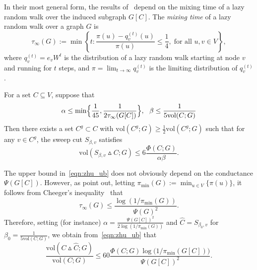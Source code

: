 \documentclass[11pt,twoside]{article}
\newcommand{\set}[1]{\left\{#1\right\}}
\newcommand{\1}{\mathbf{1}}
\newcommand{\wh}[1]{\widehat{#1}}
\newcommand{\vol}{\mathrm{vol}}
\begin{document}
In their most general form, the results of~\citet{zhu2013} depend on the mixing time of a lazy random walk over the induced subgraph $G[C]$. The \emph{mixing time} of a lazy random walk over a graph $G$ is
\begin{equation}
\label{eqn:mixing_time}
\tau_{\infty}(G) := \min\set{ t: \frac{{\pi}(u) - {q}_{v}^{(t)}(u)}
	{{\pi}(u)} \leq \frac{1}{4}, \; \text{for all $u,v \in V$}},
\end{equation}
where $q_v^{(t)} = e_v W^t$ is the distribution of a lazy random walk starting at node $v$ and running for $t$ steps, and $\pi = \lim_{t \to \infty} q_v^{(t)}$ is the limiting distribution of $q_v^{(t)}$. 
\begin{lemma}
	\label{lem:zhu}
	For a set $C \subseteq V$, suppose that
	\begin{equation}
	\label{eqn:zhu_condition}
	\alpha \leq \min\Bigl\{\frac{1}{45}, \frac{1}{2\tau_{\infty}(G[C])}\Bigr\},~~ \beta \leq \frac{1}{5\vol(C;G)}
	\end{equation}
	Then there exists a set $C^g \subset C$ with $\vol(C^g;G) \geq \frac{1}{2}\vol(C^g;G)$ such that for any $v \in C^g$, the sweep cut $S_{\beta,v}$ satisfies
	\begin{equation}
	\label{eqn:zhu_ub}
	\vol(S_{\beta,v} \vartriangle C;G) \leq 6\frac{\Phi(C;G)}{\alpha \beta}.
	\end{equation}
\end{lemma}
The upper bound in~\eqref{eqn:zhu_ub} does not obviously depend on the conductance $\Psi(G[C])$. However, as \cite{zhu2013} point out, letting $\pi_{\min}(G) := \min_{u \in V}\{\pi(u)\}$, it follows from Cheeger's inequality~\citep{chung1997} that 
\begin{equation}
\label{eqn:mixing_time_cheeger}
\tau_{\infty}(G) \leq \frac{\log(1/\pi_{\min}(G))}{\Psi(G)^2}.
\end{equation}
Therefore, setting (for instance) $\alpha = \frac{\Psi(G[C])^2}{2\log(1/\pi_{\min}(G))}$ and $\wh{C} = S_{\beta_0,v}$ for $\beta_0 = \frac{1}{5 \vol(C;G)}$, we obtain from~\eqref{eqn:zhu_ub} that 
\begin{equation}
\label{eqn:zhu_ub2}
\frac{\vol(C \vartriangle \wh{C};G)}{\vol(C; G)} \leq 60\frac{\Phi(C;G) \log\bigl( 1/\pi_{\min}(G[C])\bigr)}{\Psi(G[C])^2}.
\end{equation}
\end{document}
